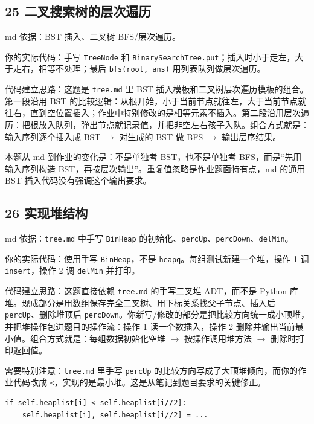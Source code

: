 \documentclass[10pt,a4paper,fontset=none]{ctexart}
\begin{document}
\subsection{25 二叉搜索树的层次遍历}
\begin{sourcebox}
md 依据：BST 插入、二叉树 BFS/层次遍历。
\end{sourcebox}
\begin{methodbox}
你的实际代码：手写 \texttt{TreeNode} 和 \texttt{BinarySearchTree.put}；插入时小于走左，大于走右，相等不处理；最后 \texttt{bfs(root, ans)} 用列表队列做层次遍历。

代码建立思路：这题是 \texttt{tree.md} 里 BST 插入模板和二叉树层次遍历模板的组合。第一段沿用 BST 的比较逻辑：从根开始，小于当前节点就往左，大于当前节点就往右，直到空位置插入；作业中特别修改的是相等元素不插入。第二段沿用层次遍历：把根放入队列，弹出节点就记录值，并把非空左右孩子入队。组合方式就是：输入序列逐个插入成 BST $\rightarrow$ 对生成的 BST 做 BFS $\rightarrow$ 输出层序结果。
\end{methodbox}
本题从 md 到作业的变化是：不是单独考 BST，也不是单独考 BFS，而是“先用输入序列构造 BST，再按层次输出”。重复值忽略是作业题面特有点，md 的通用 BST 插入代码没有强调这个输出要求。

\subsection{26 实现堆结构}
\begin{sourcebox}
md 依据：\texttt{tree.md} 中手写 \texttt{BinHeap} 的初始化、\texttt{percUp}、\texttt{percDown}、\texttt{delMin}。
\end{sourcebox}
\begin{methodbox}
你的实际代码：使用手写 \texttt{BinHeap}，不是 \texttt{heapq}。每组测试新建一个堆，操作 1 调 \texttt{insert}，操作 2 调 \texttt{delMin} 并打印。

代码建立思路：这题直接依赖 \texttt{tree.md} 的手写二叉堆 ADT，而不是 Python 库堆。现成部分是用数组保存完全二叉树、用下标关系找父子节点、插入后 \texttt{percUp}、删除堆顶后 \texttt{percDown}。你新写/修改的部分是把比较方向统一成小顶堆，并把堆操作包进题目的操作流：操作 1 读一个数插入，操作 2 删除并输出当前最小值。组合方式就是：每组数据初始化空堆 $\rightarrow$ 按操作调用堆方法 $\rightarrow$ 删除时打印返回值。
\end{methodbox}
需要特别注意：\texttt{tree.md} 里手写 \texttt{percUp} 的比较方向写成了大顶堆倾向，而你的作业代码改成 \texttt{<}，实现的是最小堆。这是从笔记到题目要求的关键修正。
\begin{lstlisting}[style=py]
if self.heaplist[i] < self.heaplist[i//2]:
    self.heaplist[i], self.heaplist[i//2] = ...
\end{lstlisting}
\end{document}

